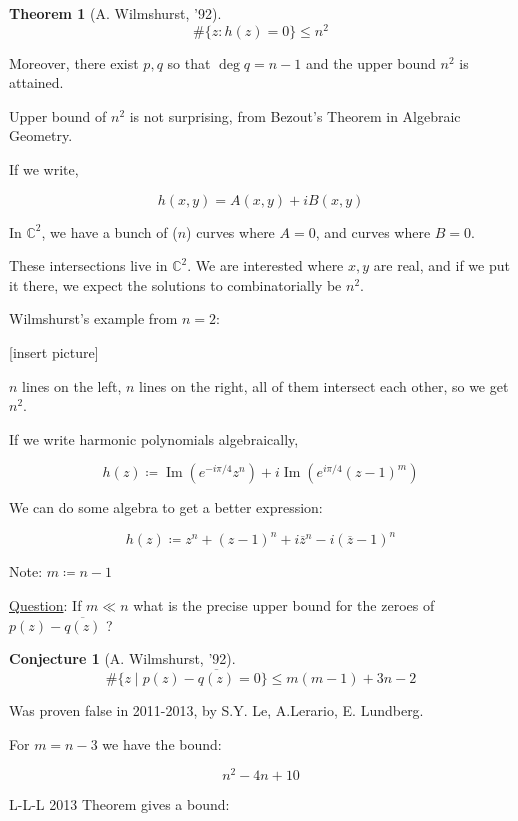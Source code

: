 \documentclass{article}
\theoremstyle{definition}
\newtheorem{theorem}{Theorem}
\newtheorem{conjecture}{Conjecture}
\begin{document}
\begin{theorem}
    [A. Wilmshurst, '92]

    \[
        \#\{ z : h(z) = 0 \} \leq n^2
    \]

    Moreover, there exist \(p,q\) so that \(\deg q = n-1\) and the upper bound \(n^2\) is attained.
\end{theorem}

Upper bound of \(n^2\) is not surprising, from Bezout's Theorem in Algebraic Geometry.

If we write,

\[
    h(x,y) = A(x,y) + i B(x,y)
\]

In \(\mathbb{C}^2\), we have a bunch of (\(n\)) curves where \(A = 0\), and curves where \(B = 0\).

These intersections live in \(\mathbb{C}^2\). We are interested where \(x,y\) are real, and if we put it there, we expect the solutions to combinatorially be \(n^2\).

Wilmshurst's example from \(n=2\):

[insert picture]

\(n\) lines on the left, \(n\) lines on the right, all of them intersect each other, so we get \(n^2\).

If we write harmonic polynomials algebraically,

\[
    h(z)\coloneqq \operatorname{Im} (e^{-i \pi / 4}z^n) + i \operatorname{Im} (e^{i \pi / 4}(z-1)^m)
\]

We can do some algebra to get a better expression:

\[
    h(z) \coloneqq z^n + (z-1)^n + i \overline{z}^n - i (\overline{z}-1)^n
\]

Note: \(m \coloneqq n-1\)

\underline{Question}: If \(m \ll n\) what is the precise upper bound for the zeroes of \(p(z) - \overline{q(z)} \) ?

\begin{conjecture}
    [A. Wilmshurst, '92]

    \[
        \#\{ z \mid p(z) - \overline{q(z)} = 0 \} \leq m(m-1) + 3n-2
    \]
\end{conjecture}

Was proven false in 2011-2013, by S.Y. Le, A.Lerario, E. Lundberg.

For \(m = n-3\) we have the bound:

\[
    n^2 - 4n + 10
\]

L-L-L 2013 Theorem gives a bound:
\end{document}

